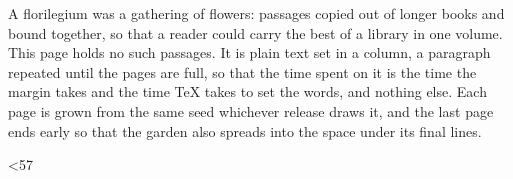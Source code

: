 \documentclass[11pt,a4paper]{article}
\newcommand\benchtext{A florilegium was a gathering of flowers: passages copied out of
  longer books and bound together, so that a reader could carry the best of a library in one
  volume. This page holds no such passages. It is plain text set in a column, a paragraph
  repeated until the pages are full, so that the time spent on it is the time the margin
  takes and the time TeX takes to set the words, and nothing else. Each page is grown from
  the same seed whichever release draws it, and the last page ends early so that the garden
  also spreads into the space under its final lines.\par}
\begin{document}
\loop\benchtext\advance{} \ifnum\benchpar<57 \repeat
\florilegiumtextend
\end{document}
